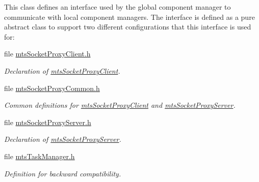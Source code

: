 \begin{DoxyCompactItemize}
\begin{DoxyCompactList}
This class defines an interface used by the global component manager to communicate with local component managers. The interface is defined as a pure abstract class to support two different configurations that this interface is used for\-: \end{DoxyCompactList}\item 
file \hyperlink{mts_socket_proxy_client_8h}{mts\-Socket\-Proxy\-Client.\-h}
\begin{DoxyCompactList}\small\item\em Declaration of \hyperlink{classmts_socket_proxy_client}{mts\-Socket\-Proxy\-Client}. \end{DoxyCompactList}\item 
file \hyperlink{mts_socket_proxy_common_8h}{mts\-Socket\-Proxy\-Common.\-h}
\begin{DoxyCompactList}\small\item\em Common definitions for \hyperlink{classmts_socket_proxy_client}{mts\-Socket\-Proxy\-Client} and \hyperlink{classmts_socket_proxy_server}{mts\-Socket\-Proxy\-Server}. \end{DoxyCompactList}\item 
file \hyperlink{mts_socket_proxy_server_8h}{mts\-Socket\-Proxy\-Server.\-h}
\begin{DoxyCompactList}\small\item\em Declaration of \hyperlink{classmts_socket_proxy_server}{mts\-Socket\-Proxy\-Server}. \end{DoxyCompactList}\item 
file \hyperlink{mts_task_manager_8h}{mts\-Task\-Manager.\-h}
\begin{DoxyCompactList}\small\item\em Definition for backward compatibility. \end{DoxyCompactList}\end{DoxyCompactItemize}
